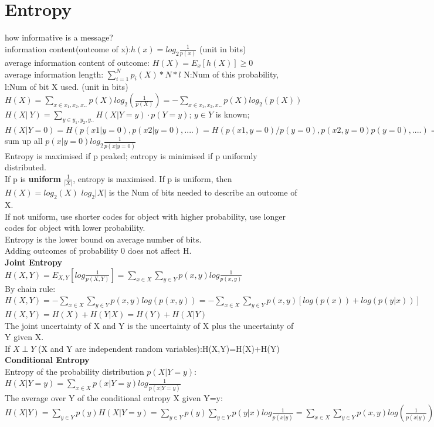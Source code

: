 \documentclass[12pt,a4paper]{extarticle}
\begin{document}
\section{Entropy}
how informative is a  message?\\
information content(outcome of x):$h(x)=log_2\frac{1}{p(x)}$ (unit in bits)\\
average information content of outcome: $H(X)= E_x[h(X)]\geq 0$\\
average information length: $\sum^N_{i=1} p_i(X)*N*l$ \quad N:Num of this probability, l:Num of bit X used. (unit in bits)\\ 
$H(X)=\sum_{x\in {x_1,x_2,x..}} p(X)log_2 (\frac{1}{p(X)})=-\sum_{x\in {x_1,x_2,x..}} p(X)log_2 (p(X))$\\
$H(X|\ Y)= \sum_{y\in {y_1,y_2,y..}} H(X|Y=y)\cdot p(Y=y) $; $y\in Y$ is known; $H(X|Y=0)=H(p(x1|y=0),p(x2|y=0),....)=H(p(x1,y=0)/p(y=0),p(x2,y=0)p(y=0),....)=$ sum up all $p(x|y=0)log_2\frac{1}{p(x|y=0)}$\\
Entropy is maximised if p peaked; entropy is minimised if p uniformly distributed.\\
If p is \textbf{uniform} $\frac{1}{|X|}$, entropy is maximised. If p is uniform, then $H(X)= log_2(X)$ \quad $log_2|X|$ is the Num of bits needed to describe an outcome of X.\\
If not uniform, use shorter codes for object with higher probability, use longer codes for object with lower probability.\\
Entropy is the lower bound on average number of bits.\\
Adding outcomes of probability 0 does not affect H.\\
\newline
\textbf{Joint Entropy}\\
$H(X,Y)=E_{X,Y}[log\frac{1}{p(X,Y)}]=\sum_{x\in X} \sum_{y\in Y} p(x,y)log\frac{1}{p(x,y)}$\\
By chain rule: $H(X,Y)=-\sum_{x\in X}\sum_{y\in Y}p(x,y)log(p(x,y))=
-\sum_{x\in X}\sum_{y\in Y}p(x,y)[log(p(x))+log(p(y|x))]$\\
$H(X,Y)=H(X)+H(Y|X)=H(Y)+H(X|Y)$\\
The joint uncertainty of X and Y is the uncertainty of X plus the uncertainty of Y given X.\\
If $X \perp Y$ (X and Y are independent random variables):H(X,Y)=H(X)+H(Y)\\
\newline
\textbf{Conditional Entropy}\\
Entropy of the probability distribution $p(X|Y=y)$: $H(X|Y=y)=\sum_{x\in X} p(x|Y=y)log \frac{1}{p(x|Y=y)}$\\
The average over Y of the conditional entropy X given Y=y: $H(X|Y)=\sum_{y\in Y} p(y)H(X|Y=y)=\sum_{y\in Y}p(y)\sum_{y\in Y}p(y|x)log\frac{1}{p(x|y)}=\sum_{x\in X}\sum_{y\in Y}p(x,y)log(\frac{1}{p(x|y)})=E_{x,y}[log(\frac{1}{p(X|Y)})]$\\
\end{document}

